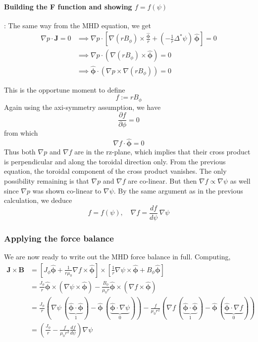 \documentclass[11pt,a4paper]{article}
\begin{document}
    \paragraph{Building the F function and showing $f=f(\psi)$}: The same way from the MHD equation, we get 
    $$\begin{aligned}
        \nabla p\cdot\mathbf{J}=0 &\implies \nabla p \cdot \left[\nabla(rB_\phi)\times\frac{\hat{\boldsymbol{\phi}}}{r}+ \left(-\frac{1}{r}\Delta^*\psi\right)\,\hat{\boldsymbol{\phi}}\right] =0 \\
        &\implies \nabla p \cdot \left(\nabla(rB_\phi) \times \hat{\boldsymbol{\phi}}\right) =0 \\
        &\implies \hat{\boldsymbol{\phi}} \cdot \left(\nabla p \times \nabla(rB_\phi)\right)=0
    \end{aligned} $$

    This is the opportune moment to define 
    $$ f := rB_\phi$$
    Again using the axi-symmetry assumption, we have 
    $$\frac{\partial f}{\partial \phi}=0$$
    from which 
    $$\nabla f \cdot \boldsymbol{\hat{\phi}}=0$$
    Thus both $\nabla p $ and $\nabla f$ are in the rz-plane, which implies that their cross product is perpendicular and along the toroidal direction only. From the previous equation, the toroidal component of the cross product vanishes. The only possibility remaining is that $\nabla p$ and $\nabla f$ are co-linear. But then $\nabla f \propto \nabla \psi$ as well since $\nabla p$ was shown co-linear to $\nabla \psi$. By the same argument as in the previous calculation, we deduce 
    $$f = f(\psi), \quad \nabla f=\frac{d f}{d\psi}\,\nabla\psi$$

    \subsubsection{Applying the force balance}

    We are now ready to write out the MHD force balance in full. Computing,
    $$\begin{aligned}
    \mathbf{J}\times\mathbf{B}&=\left[J_\phi \hat{\boldsymbol{\phi}}+\frac{1}{r\mu_0}\nabla f\times\hat{\boldsymbol{\phi}} \right] \times \left[\frac{1}{r} \nabla\psi\times\hat{\boldsymbol{\phi}}+B_\phi \hat{\boldsymbol{\phi}}\right] \\
    &=\frac{J_\phi}{r}\hat{\boldsymbol{\phi}}\times(\nabla\psi\times\hat{\boldsymbol{\phi}}) - \frac{B_\phi}{\mu_0 r}\hat{\boldsymbol{\phi}}\times(\nabla f \times \hat{\boldsymbol{\phi}}) \\
    &= \frac{J_\phi}{r}(\nabla\psi \,(\underbrace{\hat{\boldsymbol{\phi}} \cdot \hat{\boldsymbol{\phi}}}_{1})-\hat{\boldsymbol{\phi}}\,(\underbrace{\hat{\boldsymbol{\phi}} \cdot\nabla\psi}_{0}))-\frac{f}{\mu_0 r^2}(\nabla f\,(\underbrace{\hat{\boldsymbol{\phi}}\cdot\hat{\boldsymbol{\phi}}}_{1})-\hat{\boldsymbol{\phi}}\,(\underbrace{\hat{\boldsymbol{\phi}}\cdot\nabla f}_0)) \\
    &= \left(\frac{J_\phi}{r}-\frac{f}{\mu_0 r^2}\frac{d f}{d\psi}\right)\nabla\psi
    \end{aligned}$$
\end{document}
